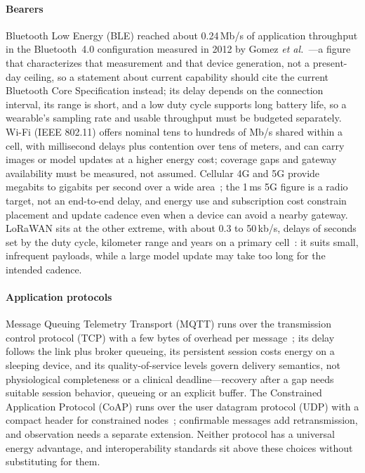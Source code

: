 \documentclass[journal]{IEEEtran}
\begin{document}
\paragraph{Bearers} Bluetooth Low Energy (BLE) reached about 0.24\,Mb/s of application throughput in the Bluetooth~4.0 configuration measured in 2012 by Gomez \emph{et al.}~\cite{gomez2012ble}---a figure that characterizes that measurement and that device generation, not a present-day ceiling, so a statement about current capability should cite the current Bluetooth Core Specification instead; its delay depends on the connection interval, its range is short, and a low duty cycle supports long battery life, so a wearable's sampling rate and usable throughput must be budgeted separately. Wi-Fi (IEEE 802.11) offers nominal tens to hundreds of Mb/s shared within a cell, with millisecond delays plus contention over tens of meters, and can carry images or model updates at a higher energy cost; coverage gaps and gateway availability must be measured, not assumed. Cellular 4G and 5G provide megabits to gigabits per second over a wide area~\cite{li20185giot}; the 1\,ms 5G figure is a radio target, not an end-to-end delay, and energy use and subscription cost constrain placement and update cadence even when a device can avoid a nearby gateway. LoRaWAN sits at the other extreme, with about 0.3 to 50\,kb/s, delays of seconds set by the duty cycle, kilometer range and years on a primary cell~\cite{raza2017lpwan}: it suits small, infrequent payloads, while a large model update may take too long for the intended cadence.

\paragraph{Application protocols} Message Queuing Telemetry Transport (MQTT) runs over the transmission control protocol (TCP) with a few bytes of overhead per message~\cite{mqtt5standard}; its delay follows the link plus broker queueing, its persistent session costs energy on a sleeping device, and its quality-of-service levels govern delivery semantics, not physiological completeness or a clinical deadline---recovery after a gap needs suitable session behavior, queueing or an explicit buffer. The Constrained Application Protocol (CoAP) runs over the user datagram protocol (UDP) with a compact header for constrained nodes~\cite{rfc7252}; confirmable messages add retransmission, and observation needs a separate extension. Neither protocol has a universal energy advantage, and interoperability standards sit above these choices without substituting for them.
\end{document}
